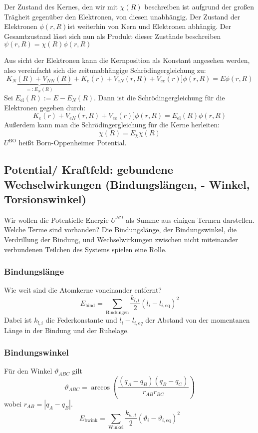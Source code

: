 \documentclass[]{article}
\begin{document}
Der Zustand des Kernes, den wir mit $\chi(R)$ beschreiben ist aufgrund der großen Trägheit gegenüber den Elektronen, von diesen unabhängig. Der Zustand der Elektronen $\phi(r,R)$ist weiterhin von Kern und Elektronen abhängig.
Der Gesamtzustand lässt sich nun als Produkt dieser Zustände beschreiben $\psi(r,R)= \chi(R) \phi(r,R)$ 

Aus sicht der Elektronen kann die Kernposition als Konstant angesehen werden, also vereinfacht sich die zeitunabhängige Schrödingergleichung zu:
\begin{equation*}
	\underbrace{K_N(R) + V_{NN}(R)}_{=:E_N(R)} + K_e(r) + V_{eN} (r,R) +  V_{ee} (r) ] \phi(r, R) = E \phi(r, R) 
\end{equation*}
Sei $E_{\text{el}}(R) := E - E_N(R)$. Dann ist die Schrödingergleichung für die Elektronen gegeben durch: 
\begin{equation*}
	 K_e(r) + V_{eN} (r, R) + V_{ee} (r) ] \phi(r, R) =
	 E_{\text{el}} (R) \phi( r, R )
\end{equation*}
Außerdem kann man die Schrödingergleichung für die Kerne herleiten: 
\begin{equation*}
[ K_N (R) + \underbrace{V_{NN} (R) + E_{\text{el}} (R)}_{=:U^{\text{BO}}} ] \chi(R) = E_{\chi} \chi(R)
\end{equation*}
$U^{\text{BO}}$ heißt Born-Oppenheimer Potential. 

\subsection*{Potential/ Kraftfeld: gebundene Wechselwirkungen (Bindungslängen, - Winkel, Torsionswinkel)}
Wir wollen die Potentielle Energie $U^{BO}$ als Summe aus einigen Termen darstellen. Welche Terme sind vorhanden? Die Bindungslänge, der Bindungswinkel, die Verdrillung der Bindung, und Wechselwirkungen zwischen nicht miteinander verbundenen Teilchen des Systems spielen eine Rolle.

\subsubsection*{Bindungslänge}
Wie weit sind die Atomkerne voneinander entfernt?  
\[ E_{\text{bind}} = \sum_{\text{Bindungen}} \frac{k_{l,i}}{2} \left( l_i - l_{i,\text{eq}} \right)^2 \]
Dabei ist $k_{l,i}$ die Federkonstante und $l_i-l_{i,eq}$ der Abstand von der momentanen Länge in der Bindung und der Ruhelage. 

\subsubsection*{Bindungswinkel}
Für den Winkel $\vartheta_{ABC}$ gilt
\begin{equation*}
\vartheta_{ABC} = \arccos \left( \frac{(q_A - q_B) (q_B - q_C)}{r_{AB} r_{BC}} \right)
\end{equation*}
wobei $r_{AB} = |q_A - q_B|$.
\begin{equation*}
E_{\text{bwink}} = \sum_{\text{Winkel}} \frac{k_{w,i}}{2} \left( \vartheta_i - \vartheta_{i, \text{eq}} \right)^2
\end{equation*}
\end{document}
